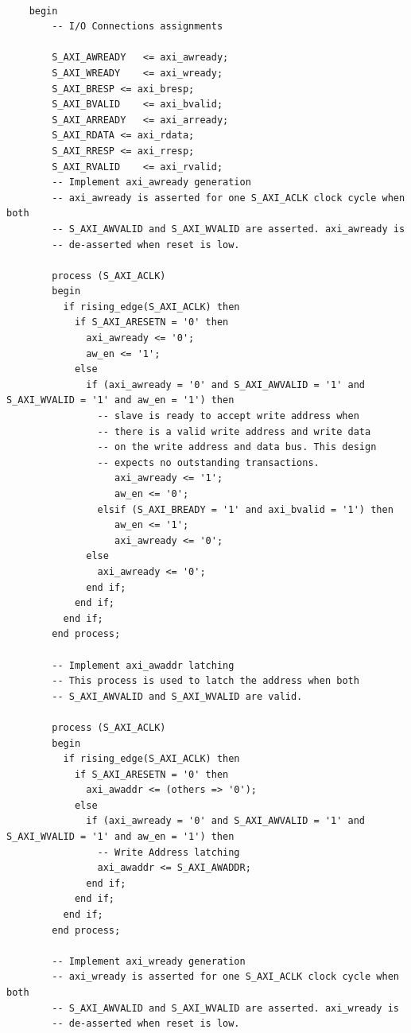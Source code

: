 \begin{verbatim}
    
    begin
        -- I/O Connections assignments
    
        S_AXI_AWREADY	<= axi_awready;
        S_AXI_WREADY	<= axi_wready;
        S_AXI_BRESP	<= axi_bresp;
        S_AXI_BVALID	<= axi_bvalid;
        S_AXI_ARREADY	<= axi_arready;
        S_AXI_RDATA	<= axi_rdata;
        S_AXI_RRESP	<= axi_rresp;
        S_AXI_RVALID	<= axi_rvalid;
        -- Implement axi_awready generation
        -- axi_awready is asserted for one S_AXI_ACLK clock cycle when both
        -- S_AXI_AWVALID and S_AXI_WVALID are asserted. axi_awready is
        -- de-asserted when reset is low.
    
        process (S_AXI_ACLK)
        begin
          if rising_edge(S_AXI_ACLK) then 
            if S_AXI_ARESETN = '0' then
              axi_awready <= '0';
              aw_en <= '1';
            else
              if (axi_awready = '0' and S_AXI_AWVALID = '1' and S_AXI_WVALID = '1' and aw_en = '1') then
                -- slave is ready to accept write address when
                -- there is a valid write address and write data
                -- on the write address and data bus. This design 
                -- expects no outstanding transactions. 
                   axi_awready <= '1';
                   aw_en <= '0';
                elsif (S_AXI_BREADY = '1' and axi_bvalid = '1') then
                   aw_en <= '1';
                   axi_awready <= '0';
              else
                axi_awready <= '0';
              end if;
            end if;
          end if;
        end process;
    
        -- Implement axi_awaddr latching
        -- This process is used to latch the address when both 
        -- S_AXI_AWVALID and S_AXI_WVALID are valid. 
    
        process (S_AXI_ACLK)
        begin
          if rising_edge(S_AXI_ACLK) then 
            if S_AXI_ARESETN = '0' then
              axi_awaddr <= (others => '0');
            else
              if (axi_awready = '0' and S_AXI_AWVALID = '1' and S_AXI_WVALID = '1' and aw_en = '1') then
                -- Write Address latching
                axi_awaddr <= S_AXI_AWADDR;
              end if;
            end if;
          end if;                   
        end process; 
    
        -- Implement axi_wready generation
        -- axi_wready is asserted for one S_AXI_ACLK clock cycle when both
        -- S_AXI_AWVALID and S_AXI_WVALID are asserted. axi_wready is 
        -- de-asserted when reset is low. 
    

\end{verbatim}
